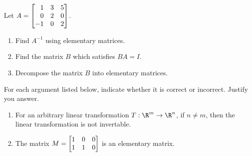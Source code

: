 \begin{exercises}
\begin{problist}
	
		\prob 	Let $A=\mat{1&3&5\\0&2&0\\-1&0&2}$. 
		    \begin{enumerate}
		        \item Find $A^{-1}$ using elementary matrices.
		        \item Find the matrix $B$ which satisfies $BA=I$.
		        \item Decompose the matrix $B$ into elementary matrices. 
		    \end{enumerate}  
	
		\prob For each argument listed below, indicate whether it is correct or incorrect. Justify you answer.
            \begin{enumerate}
                \item   For an  arbitrary linear transformation $T:\R^m\to\R^n$, if $n \neq m$, then the linear transformation is not invertable. 
                \item   The matrix $M = \mat{1&0&0\\1&1&0}$ is an elementary matrix.
            \end{enumerate}
		
	\end{problist}
\end{exercises}
